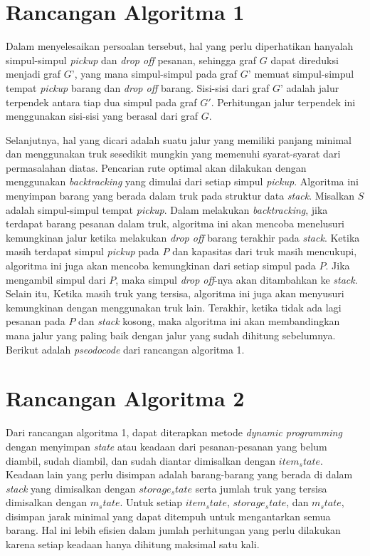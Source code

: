 \section{Rancangan Algoritma 1}

Dalam menyelesaikan persoalan tersebut, hal yang perlu diperhatikan hanyalah simpul-simpul
\textit{pickup} dan \textit{drop off} pesanan, sehingga graf $G$ dapat direduksi menjadi graf $G’$,
yang mana simpul-simpul pada graf $G’$ memuat simpul-simpul tempat \textit{pickup} barang dan
\textit{drop off} barang. Sisi-sisi dari graf $G’$ adalah jalur terpendek antara tiap dua simpul
pada graf $G'$. Perhitungan jalur terpendek ini menggunakan sisi-sisi yang berasal dari graf $G$.

Selanjutnya, hal yang dicari adalah suatu jalur yang memiliki panjang minimal dan menggunakan truk
sesedikit mungkin yang memenuhi syarat-syarat dari permasalahan diatas. Pencarian rute optimal akan
dilakukan dengan menggunakan \textit{backtracking} yang dimulai dari setiap simpul \textit{pickup}.
Algoritma ini menyimpan barang yang berada dalam truk pada struktur data \textit{stack}. Misalkan
$S$ adalah simpul-simpul tempat \textit{pickup}. Dalam melakukan \textit{backtracking}, jika
terdapat barang pesanan dalam truk, algoritma ini akan mencoba menelusuri kemungkinan jalur ketika
melakukan \textit{drop off} barang terakhir pada \textit{stack}. Ketika masih terdapat simpul
\textit{pickup} pada $P$ dan kapasitas dari truk masih mencukupi, algoritma ini juga akan mencoba
kemungkinan dari setiap simpul pada $P$. Jika mengambil simpul dari $P$, maka simpul \textit{drop
off}-nya akan ditambahkan ke \textit{stack}. Selain itu, Ketika masih truk yang tersisa, algoritma
ini juga akan menyusuri kemungkinan dengan menggunakan truk lain. Terakhir, ketika tidak ada lagi
pesanan pada $P$ dan \textit{stack} kosong, maka algoritma ini akan membandingkan mana jalur yang
paling baik dengan jalur yang sudah dihitung sebelumnya. Berikut adalah \textit{pseodocode} dari
rancangan algoritma 1.

\medskip


\section{Rancangan Algoritma 2}

Dari rancangan algoritma 1, dapat diterapkan metode \textit{dynamic programming} dengan menyimpan
\textit{state} atau keadaan dari pesanan-pesanan yang belum diambil, sudah diambil, dan sudah
diantar dimisalkan dengan $item_state$. Keadaan lain yang perlu disimpan adalah barang-barang yang
berada di dalam \textit{stack} yang dimisalkan dengan $storage_state$ serta jumlah truk yang tersisa
dimisalkan dengan $m_state$. Untuk setiap $item_state$, $storage_state$, dan $m_state$, disimpan
jarak minimal yang dapat ditempuh untuk mengantarkan semua barang. Hal ini lebih efisien dalam
jumlah perhitungan yang perlu dilakukan karena setiap keadaan hanya dihitung maksimal satu kali.


